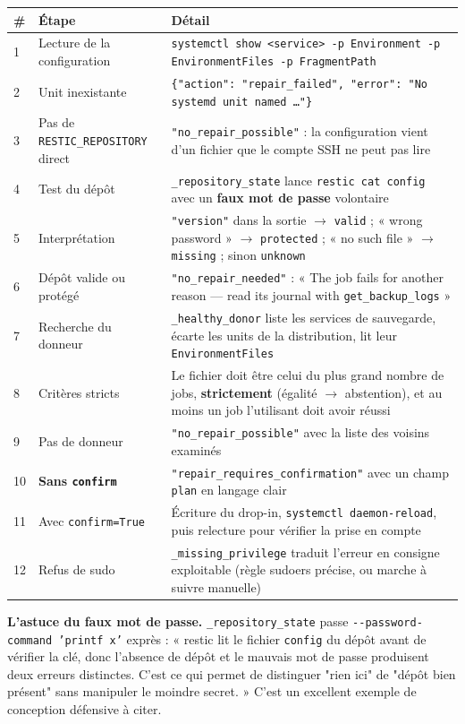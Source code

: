 \documentclass[11pt,a4paper]{report}
\newcommand{\fn}[1]{\texttt{\small\textcolor{oasisviolet}{#1}}}
\newcommand{\arrowto}{\ensuremath{\rightarrow}}
\begin{document}
\begin{longtable}{@{}p{0.7cm}p{4.6cm}p{9.4cm}@{}}
\toprule
\textbf{\#} & \textbf{Étape} & \textbf{Détail}\\
\midrule
\endhead
1 & Lecture de la configuration & \texttt{systemctl show <service> -p Environment -p EnvironmentFiles -p FragmentPath}\\
2 & Unit inexistante & \texttt{\{"action": "repair\_failed", "error": "No systemd unit named \ldots"\}}\\
3 & Pas de \texttt{RESTIC\_REPOSITORY} direct & \texttt{"no\_repair\_possible"} : la configuration vient d'un fichier que le compte SSH ne peut pas lire\\
4 & Test du dépôt & \fn{\_repository\_state} lance \texttt{restic cat config} avec un \textbf{faux mot de passe} volontaire\\
5 & Interprétation & \texttt{"version"} dans la sortie \arrowto{} \texttt{valid} ; « wrong password » \arrowto{} \texttt{protected} ; « no such file » \arrowto{} \texttt{missing} ; sinon \texttt{unknown}\\
6 & Dépôt valide ou protégé & \texttt{"no\_repair\_needed"} : « The job fails for another reason --- read its journal with \fn{get\_backup\_logs} »\\
7 & Recherche du donneur & \fn{\_healthy\_donor} liste les services de sauvegarde, écarte les units de la distribution, lit leur \texttt{EnvironmentFiles}\\
8 & Critères stricts & Le fichier doit être celui du plus grand nombre de jobs, \textbf{strictement} (égalité \arrowto{} abstention), et au moins un job l'utilisant doit avoir réussi\\
9 & Pas de donneur & \texttt{"no\_repair\_possible"} avec la liste des voisins examinés\\
10 & \textbf{Sans \texttt{confirm}} & \texttt{"repair\_requires\_confirmation"} avec un champ \texttt{plan} en langage clair\\
11 & Avec \texttt{confirm=True} & Écriture du drop-in, \texttt{systemctl daemon-reload}, puis relecture pour vérifier la prise en compte\\
12 & Refus de sudo & \fn{\_missing\_privilege} traduit l'erreur en consigne exploitable (règle sudoers précise, ou marche à suivre manuelle)\\
\bottomrule
\end{longtable}

\begin{keybox}
\textbf{L'astuce du faux mot de passe.} \fn{\_repository\_state} passe
\texttt{-{}-password-command 'printf x'} exprès : « restic lit le fichier
\texttt{config} du dépôt avant de vérifier la clé, donc l'absence de dépôt et le
mauvais mot de passe produisent deux erreurs distinctes. C'est ce qui permet de
distinguer "rien ici" de "dépôt bien présent" sans manipuler le moindre
secret. » C'est un excellent exemple de conception défensive à citer.
\end{keybox}
\end{document}
